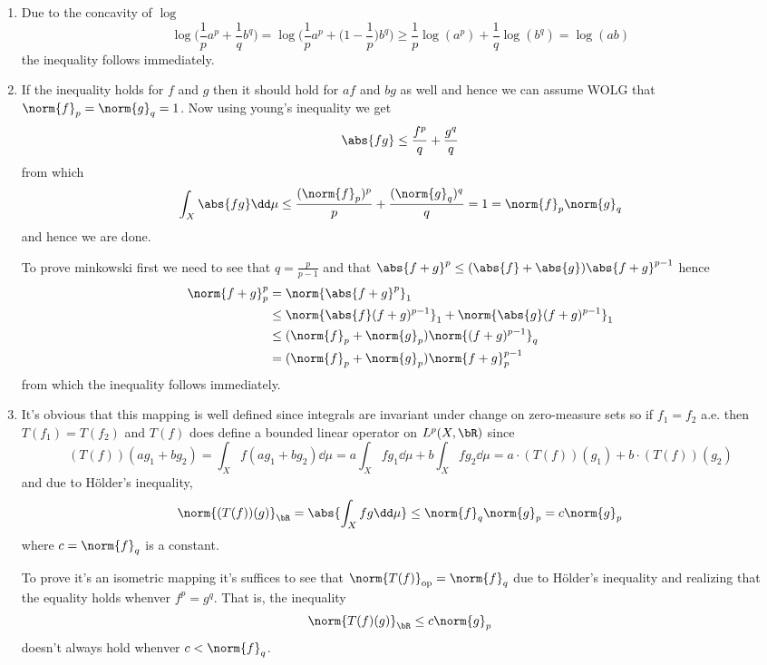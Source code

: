 \documentclass{pset}
\begin{document}
\begin{problem}
    \begin{enumerate}[label=\alph*.]
        \item Due to the concavity of $\log$
        \[\log\bigg(\frac{1}{p}a^p+\frac{1}{q}b^q\bigg)=\log\bigg(\frac{1}{p}a^p+\bigg(1-\frac{1}{p}\bigg)b^q\bigg) \geq \frac{1}{p}\log(a^p)+\frac{1}{q}\log(b^q) = \log(ab)\]
        the inequality follows immediately.
        \item If the inequality holds for $f$ and $g$ then it should hold for $af$ and $bg$ as well and hence we can assume WOLG that $\norm{f}_p=\norm{g}_q=1$. Now using young's inequality we get
        \[\abs{fg} \leq \frac{f^p}{q} + \frac{g^q}{q}\]
        from which
        \[\int_X \abs{fg} \dd\mu \leq \frac{(\norm{f}_p)^p}{p} + \frac{(\norm{g}_q)^q}{q} = 1 = \norm{f}_p\norm{g}_q\]
        and hence we are done.

        To prove minkowski first we need to see that $q = \frac{p}{p-1}$ and that $\abs{f+g}^p\leq(\abs{f}+\abs{g})\abs{f+g}^{p-1}$ hence
        \begin{align*}
            \norm{f+g}_p^p &= \norm{\abs{f+g}^p}_1 \\
            &\leq \norm{\abs{f}(f+g)^{p-1}}_1+\norm{\abs{g}(f+g)^{p-1}}_1 \\
            &\leq (\norm{f}_p+\norm{g}_p)\norm{(f+g)^{p-1}}_q \\
            &= (\norm{f}_p+\norm{g}_p)\norm{f+g}_p^{p-1}
        \end{align*}
        from which the inequality follows immediately.
        \item It's obvious that this mapping is well defined since integrals are invariant under change on zero-measure sets so if $f_1=f_2$ a.e. then $T(f_1)=T(f_2)$ and $T(f)$ does define a bounded linear operator on $L^p(X, \bR)$ since
        \[(T(f))(ag_1+bg_2) = \int_X f(ag_1+bg_2)\dd\mu = a\int_X fg_1\dd\mu + b\int_X fg_2\dd\mu = a\cdot(T(f))(g_1)+b\cdot(T(f))(g_2)\]
        and due to Hölder's inequality,
        \[\norm{(T(f))(g)}_\bR = \abs{\int_X fg\dd\mu} \leq \norm{f}_q\norm{g}_p = c\norm{g}_p\]
        where $c=\norm{f}_q$ is a constant.
        
        To prove it's an isometric mapping it's suffices to see that $\norm{T(f)}_{\operatorname{op}}=\norm{f}_q$ due to Hölder's inequality and realizing that the equality holds whenver $f^p=g^q$. That is, the inequality
        \[\norm{T(f)(g)}_\bR\leq c\norm{g}_p\]
        doesn't always hold whenver $c<\norm{f}_q$. 
        

\end{enumerate}
\end{problem}
\end{document}
